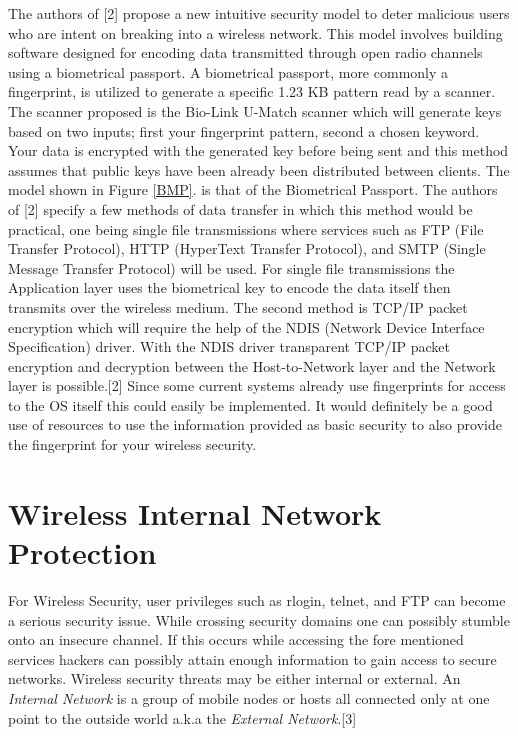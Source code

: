 \documentclass[11pt,onecolumn,cspaper,compsoc]{IEEEtran}
\begin{document}
The authors of [2] propose a new intuitive security model to deter malicious users who are intent on breaking into a wireless network. 
This model involves building software designed for encoding data transmitted through open radio channels using a biometrical passport. 
A biometrical passport, more commonly a fingerprint, is utilized to generate a specific 1.23 KB pattern read by a 
scanner. The scanner proposed is the Bio-Link U-Match scanner which will generate keys based on two inputs; first your fingerprint pattern, 
second a chosen keyword. Your data is encrypted with the generated key before being sent and this method assumes that public keys have been 
already been distributed between clients. The model shown in Figure \ref{BMP}. is that of the Biometrical Passport. The authors of [2] specify 
a few methods of data transfer in which this method would be practical, one being single file transmissions where services such as FTP (File 
Transfer Protocol), HTTP (HyperText Transfer Protocol), and SMTP (Single Message Transfer Protocol) will be used. For single file 
transmissions the Application layer uses the biometrical key to encode the data itself then transmits over the wireless medium. The second 
method is TCP/IP packet encryption which will require the help of the NDIS (Network Device Interface Specification) driver. With the NDIS 
driver transparent TCP/IP packet encryption and decryption between the Host-to-Network layer and the Network layer is possible.[2] Since some 
current systems already use fingerprints for access to the OS itself this could easily be implemented. It would definitely be a good use of 
resources to use the information provided as basic security to also provide the fingerprint for your wireless security.

\section{Wireless Internal Network Protection}

For Wireless Security, user privileges such as rlogin, telnet, and FTP can become a serious security issue. While crossing security 
domains one can possibly stumble onto an insecure channel. If this occurs while accessing the fore mentioned services hackers can possibly 
attain enough information to gain access to secure networks. Wireless security threats may be either internal or external. An 
\textit{Internal Network} is a group of mobile nodes or hosts all connected only at one point to the outside world a.k.a the \textit{External Network}.[3]
\end{document}
